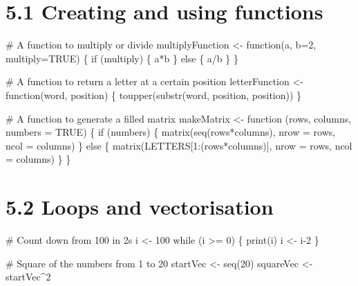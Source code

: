 \documentclass[a4paper]{book}
\newenvironment{Shaded}{}{}
\newcommand{\KeywordTok}[1]{\textcolor[rgb]{0.00,0.00,1.00}{{#1}}}
\newcommand{\DataTypeTok}[1]{{#1}}
\newcommand{\DecValTok}[1]{{#1}}
\newcommand{\StringTok}[1]{\textcolor[rgb]{0.00,0.50,0.50}{{#1}}}
\newcommand{\CommentTok}[1]{\textcolor[rgb]{0.00,0.50,0.00}{{#1}}}
\newcommand{\OtherTok}[1]{\textcolor[rgb]{1.00,0.25,0.00}{{#1}}}
\newcommand{\NormalTok}[1]{{#1}}
\newlength{\leftbarwidth}
\newlength{\leftbarsep}
\newcommand*{\leftbarcolorcmd}{\color{darkgray}}%
\renewenvironment{leftbar}{%
    \def\FrameCommand{{\leftbarcolorcmd{\vrule width \leftbarwidth\relax\hspace {\leftbarsep}}}}%
    \MakeFramed {\advance \hsize -\width \FrameRestore }%
}{%
    \endMakeFramed
}
\renewenvironment{Shaded}
{\vspace{0em}\begin{leftbar}\begin{snugshade}}
{\end{snugshade}\end{leftbar}\vspace{0pt}}
\begin{document}
\section*{5.1 Creating and using
functions}\label{creating-and-using-functions}

\begin{Shaded}
\begin{Highlighting}[]
\CommentTok{# A function to multiply or divide}
\NormalTok{multiplyFunction <-}\StringTok{ }\NormalTok{function(a, }\DataTypeTok{b=}\DecValTok{2}\NormalTok{, }\DataTypeTok{multiply=}\OtherTok{TRUE}\NormalTok{) \{}
  \NormalTok{if (multiply) \{}
    \NormalTok{a*b}
  \NormalTok{\} else \{}
    \NormalTok{a/b}
  \NormalTok{\}}
\NormalTok{\}}

\CommentTok{# A function to return a letter at a certain position}
\NormalTok{letterFunction <-}\StringTok{ }\NormalTok{function(word, position) \{}
  \KeywordTok{toupper}\NormalTok{(}\KeywordTok{substr}\NormalTok{(word, position, position))}
\NormalTok{\}}

\CommentTok{# A function to generate a filled matrix}
\NormalTok{makeMatrix <-}\StringTok{ }\NormalTok{function (rows, columns, }\DataTypeTok{numbers =} \OtherTok{TRUE}\NormalTok{) \{}
  \NormalTok{if (numbers) \{}
    \KeywordTok{matrix}\NormalTok{(}\KeywordTok{seq}\NormalTok{(rows*columns), }\DataTypeTok{nrow =} \NormalTok{rows, }\DataTypeTok{ncol =} \NormalTok{columns)}
  \NormalTok{\} else \{}
    \KeywordTok{matrix}\NormalTok{(LETTERS[}\DecValTok{1}\NormalTok{:(rows*columns)], }\DataTypeTok{nrow =} \NormalTok{rows, }\DataTypeTok{ncol =} \NormalTok{columns)}
  \NormalTok{\}}
\NormalTok{\}}
\end{Highlighting}
\end{Shaded}

\section*{5.2 Loops and vectorisation}\label{loops-and-vectorisation}

\begin{Shaded}
\begin{Highlighting}[]
\CommentTok{# Count down from 100 in 2s}
\NormalTok{i <-}\StringTok{ }\DecValTok{100}
\NormalTok{while (i >=}\StringTok{ }\DecValTok{0}\NormalTok{) \{}
  \KeywordTok{print}\NormalTok{(i)}
  \NormalTok{i <-}\StringTok{ }\NormalTok{i}\DecValTok{-2}
\NormalTok{\}}

\CommentTok{# Square of the numbers from 1 to 20}
\NormalTok{startVec <-}\StringTok{ }\KeywordTok{seq}\NormalTok{(}\DecValTok{20}\NormalTok{)}
\NormalTok{squareVec <-}\StringTok{ }\NormalTok{startVec^}\DecValTok{2}
\end{Highlighting}
\end{Shaded}
\end{document}
